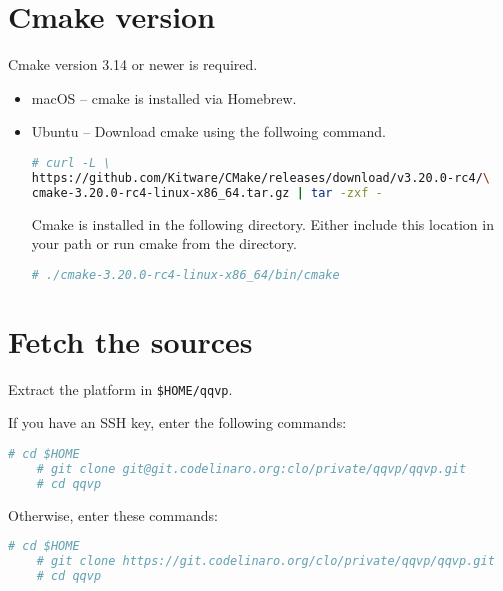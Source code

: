 \section{Cmake version}

Cmake version 3.14 or newer is required.

\begin{itemize}
\item macOS -- cmake is installed via Homebrew.
\item Ubuntu -- Download cmake using the follwoing command.

\small
\begin{lstlisting}[language=bash]
    # curl -L \
https://github.com/Kitware/CMake/releases/download/v3.20.0-rc4/\
cmake-3.20.0-rc4-linux-x86_64.tar.gz | tar -zxf -
\end{lstlisting}
\normalsize

Cmake is installed in the following directory. Either include this location in your path or run cmake from the directory.

\small
\begin{lstlisting}[language=bash]
    # ./cmake-3.20.0-rc4-linux-x86_64/bin/cmake
\end{lstlisting}
\normalsize

\end{itemize}

\section{Fetch the sources}

Extract the platform in {\small{\lstinline!$HOME/qqvp!}}.

If you have an SSH key, enter the following commands:

\small
\begin{lstlisting}[language=bash]
    # cd $HOME
    # git clone git@git.codelinaro.org:clo/private/qqvp/qqvp.git
    # cd qqvp
\end{lstlisting}
\normalsize

Otherwise, enter these commands:

\small
\begin{lstlisting}[language=bash]
    # cd $HOME
    # git clone https://git.codelinaro.org/clo/private/qqvp/qqvp.git
    # cd qqvp
\end{lstlisting}
\normalsize

